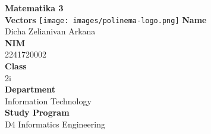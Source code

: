 \documentclass[12pt,titlepage]{article}
\newcommand{\vSubject}{Matematika 3}
\newcommand{\vSubtitle}{Vectors}
\newcommand{\vName}{Dicha Zelianivan Arkana}
\newcommand{\vNIM}{2241720002}
\newcommand{\vClass}{2i}
\newcommand{\vDepartment}{Information Technology}
\newcommand{\vStudyProgram}{D4 Informatics Engineering}
\begin{document}
\begin{titlepage}
    \centering
    \vfill
    {\bfseries\LARGE
        \vSubject\\
        \vskip0.25cm
        \vSubtitle
    }
    \vfill
    \texttt{[image: images/polinema-logo.png]}
    \vfill
    {
        \textbf{Name}\\
        \vName\\
        \vskip0.5cm
        \textbf{NIM}\\
        \vNIM\\
        \vskip0.5cm
        \textbf{Class}\\
        \vClass\\
        \vskip0.5cm
        \textbf{Department}\\
        \vDepartment\\
        \vskip0.5cm
        \textbf{Study Program}\\
        \vStudyProgram
    }
\end{titlepage}
\end{document}
